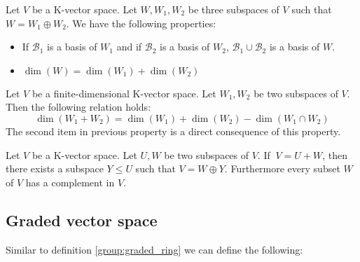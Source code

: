         \begin{theorem}
			\label{linalgebra:theorem:direct_sum}
            Let $V$ be a K-vector space. Let $W, W_1, W_2$ be three subspaces of $V$ such that $W=W_1\oplus W_2$. We have the following properties:
            \begin{itemize}
				\item If $\mathcal{B}_1$ is a basis of $W_1$ and if $\mathcal{B}_2$ is a basis of $W_2$, $\mathcal{B}_1\cup\mathcal{B}_2$ is a basis of $W$.
                \item $\dim(W) = \dim(W_1) + \dim(W_2)$
			\end{itemize}
		\end{theorem}
        \begin{theorem}
			\label{linalgebra:theorem:sum}
            Let $V$ be a finite-dimensional K-vector space. Let $W_1, W_2$ be two subspaces of $V$. Then the following relation holds:
            \begin{equation}
				\dim(W_1 + W_2) = \dim(W_1) + \dim(W_2) - \dim(W_1\cap W_2)
			\end{equation}
            The second item in previous property is a direct consequence of this property.
		\end{theorem}

        \begin{theorem}
			\label{linalgebra:theorem:complement}
            Let $V$ be a K-vector space. Let $U,W$ be two subspaces of $V$. If $\ V = U+W$, then there exists a subspace $Y\leq U$ such that $V = W\oplus Y$. Furthermore every subset $W$ of $V$ has a complement in $V$.
		\end{theorem}
        
\subsection{Graded vector space}
	Similar to definition \ref{group:graded_ring} we can define the following:
	
